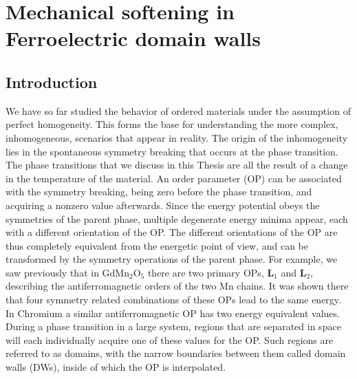 \chapter{Mechanical softening in Ferroelectric domain walls}


\section{Introduction}
We have so far studied the behavior of ordered materials under the assumption of perfect homogeneity.
This forms the base for understanding the more complex, inhomogeneous, scenarios that appear in reality.
The origin of the inhomogeneity lies in the spontaneous symmetry breaking that occurs at the phase transition.
The phase transitions that we discuss in this Thesis are all the result of a change in the temperature of the material. 
An order parameter (OP) can be associated with the symmetry breaking, being zero before the phase transition, and acquiring a nonzero value afterwards.
Since the energy potential obeys the symmetries of the parent phase, multiple degenerate energy minima appear, each with a different orientation of the OP. 
The different orientations of the OP are thus completely equivalent from the energetic point of view, and can be transformed by the symmetry operations of the parent phase.
For example, we saw previously that in GdMn$_2$O$_5$ there are two primary OPs, $\bm{L}_1$ and $\bm{L}_2$, describing the antiferromagnetic orders of the two Mn chains.
It was shown there that four symmetry related combinations of these OPs lead to the same energy.
In Chromium a similar antiferromagnetic OP has two energy equivalent values.
During a phase transition in a large system, regions that are separated in space will each individually acquire one of these values for the OP.
Such regions are referred to as domains, with the narrow boundaries between them called domain walls (DWs), inside of which the OP is interpolated.


